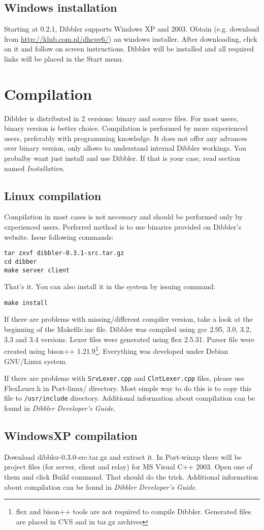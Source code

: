 \subsection{Windows installation}
Starting at 0.2.1, Dibbler supports Windows XP and 2003. 
Obtain (e.g. download from \url{http://klub.com.pl/dhcpv6/}) an
windows installer. After downloading, click on it and follow on screen
instructions. Dibbler will be installed and all required links will be
placed in the Start menu.

\section{Compilation}
Dibbler is distributed in 2 versions: binary and source files. For
most users, binary version is better choice.  Compilation is
performed by more experienced users, preferably with programming
knowledge. It does not offer any advances over binary version, only
allows to understand internal Dibbler workings. You probalby want just
install and use Dibbler. If that is your case, read section
named \emph{Installation}.

\subsection{Linux compilation}

Compilation in most cases is not necessary and should be performed
only by experienced users. Perferred method is to use binaries
provided on Dibbler's website. Issue following commands:
\begin{verbatim}
tar zxvf dibbler-0.3.1-src.tar.gz
cd dibber
make server client
\end{verbatim}
That's it. You can also install it in the system by issuing command:

\begin{verbatim}
make install
\end{verbatim}

If there are problems with missing/different compiler
version, take a look at the beginning of the Makefile.inc
file. Dibbler was compiled using gcc 2.95, 3.0, 3.2, 3.3 and 3.4
versions. Lexer files were generated using flex 2.5.31. Parser file
were created using bison++ 1.21.9\footnote{flex and bison++ tools are
  not required to compile Dibbler. Generated files are placed in CVS
  and in tar.gz archives}. Everything was developed under Debian
GNU/Linux system.

If there are problems with \verb+SrvLexer.cpp+ and
\verb+ClntLexer.cpp+ files, please use FlexLexer.h in Port-linux/
directory. Most simple way to do this is to copy this file to
\verb+/usr/include+ directory. Additional information about
compilation can be found in \emph{Dibbler Developer's Guide}.

\subsection{WindowsXP compilation}
Download dibbler-0.3.0-src.tar.gz and extract it. In Port-winxp there
will be project files (for server, client and relay) for MS
Visual C++ 2003. Open one of them and click Build command. That should
do the trick. Additional information about compilation can be found in
\emph{Dibbler Developer's Guide}.

